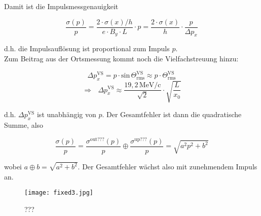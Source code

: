 Damit ist die Impulsmessgenauigkeit

\[ \frac{\sigma(p)}{p} = \frac{2\cdot\sigma(x)/h}{e\cdot B_y\cdot L}\cdot p =
\frac{2\cdot\sigma(x)}{h}\cdot \frac{p}{\Delta p_x} \]

d.h. die Impulsauflösung ist proportional zum Impuls $p$.
\\
Zum Beitrag aus der Ortsmessung kommt noch die Vielfachstreuung hinzu:

\[\Delta p_x^{\text{VS}} = p\cdot \text{sin}\,\Theta^{\text{VS}}_{\text{rms}} \approx p \cdot
\Theta^{\text{VS}}_{\text{rms}} \]
\[ \Rightarrow~~~ \Delta p_x^{\text{VS}} \approx \frac{19{,}2\,\text{MeV/c}}{\sqrt{2}}\cdot
\sqrt{\frac{L}{x_0}} \]

d.h. $\Delta p_x^{\text{VS}}$ ist unabhängig von $p$. Der Gesamtfehler ist dann die quadratische
Summe, also

\[ \frac{\sigma(p)}{p} = \frac{\sigma^{\text{out???}}(p)}{p} \oplus
\frac{\sigma^{\text{up???}}(p)}{p} = \sqrt{a^2p^2+b^2}\]

wobei $a\oplus b = \sqrt{a^2+b^2}$. Der Gesamtfehler wächst also mit zunehmendem Impuls an.

\begin{figure}[H]
	\centering
	\texttt{[image: fixed3.jpg]}
	\caption{	 ???}
	\label{fixed3}
\end{figure}